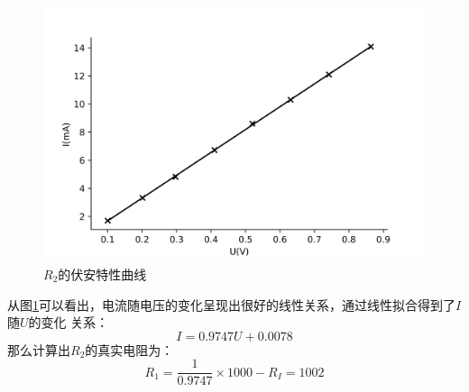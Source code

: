 \documentclass[a4paper]{ctexart}
\begin{document}
		\begin{figure}[htbp]
			\includegraphics[scale=0.65]{R1_curve}
			\centering
			\caption{$R_2$的伏安特性曲线}
			\label{R2curve}
		\end{figure}
		\par 
		从图\ref{R2curve}可以看出，电流随电压的变化呈现出很好的线性关系，通过线性拟合得到了$I$随$U$的变化
		关系：
		$$
		I = 0.9747U + 0.0078
		$$
		那么计算出$R_2$的真实电阻为：
		$$
		R_1 = \frac{1}{0.9747} \times{1000} - R_I = 1002
		$$
\end{document}
